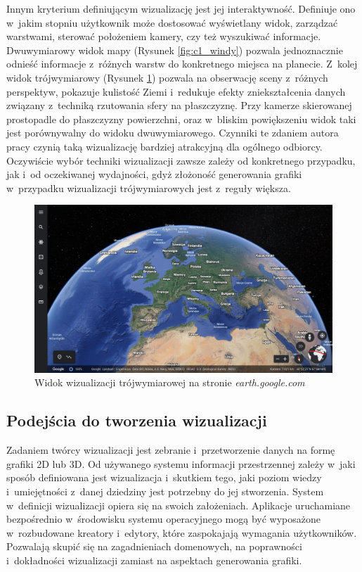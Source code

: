 Innym kryterium definiującym wizualizację jest jej interaktywność. Definiuje ono w~jakim stopniu użytkownik może dostosować wyświetlany widok, zarządzać warstwami, sterować położeniem kamery, czy też wyszukiwać informacje. Dwuwymiarowy widok mapy (Rysunek \ref{fig:c1_windy}) pozwala jednoznacznie odnieść informacje z~różnych warstw do konkretnego miejsca na planecie. Z~kolej widok trójwymiarowy (Rysunek \ref{fig:c1_google_earth}) pozwala na obserwację sceny z~różnych perspektyw, pokazuje kulistość Ziemi i~redukuje efekty zniekształcenia danych związany z~techniką rzutowania sfery na płaszczyznę. Przy kamerze skierowanej prostopadle do płaszczyzny powierzchni, oraz w~bliskim powiększeniu widok taki jest porównywalny do widoku dwuwymiarowego. Czynniki te zdaniem autora pracy czynią taką wizualizację bardziej atrakcyjną dla ogólnego odbiorcy. Oczywiście wybór techniki wizualizacji zawsze zależy od konkretnego przypadku, jak i~od oczekiwanej wydajności, gdyż złożoność generowania grafiki w~przypadku wizualizacji trójwymiarowych jest z~reguły większa.


\begin{figure}[h]
    \centering
    \includegraphics[width=\linewidth]{img/c1_google_earth.png}
    \caption{Widok wizualizacji trójwymiarowej na stronie \textit{earth.google.com}}
    \label{fig:c1_google_earth}
\end{figure}

\subsection{Podejścia do tworzenia wizualizacji}

Zadaniem twórcy wizualizacji jest zebranie i~przetworzenie danych na formę grafiki 2D lub 3D. Od używanego systemu informacji przestrzennej zależy w~jaki sposób definiowana jest wizualizacja i~skutkiem tego, jaki poziom wiedzy i~umiejętności z~danej dziedziny jest potrzebny do jej stworzenia. System w~definicji wizualizacji opiera się na swoich założeniach. Aplikacje uruchamiane bezpośrednio w~środowisku systemu operacyjnego mogą być wyposażone w~rozbudowane kreatory i~edytory, które zaspokajają wymagania użytkowników. Pozwalają skupić się na zagadnieniach domenowych, na poprawności i~dokładności wizualizacji zamiast na aspektach generowania grafiki. 

